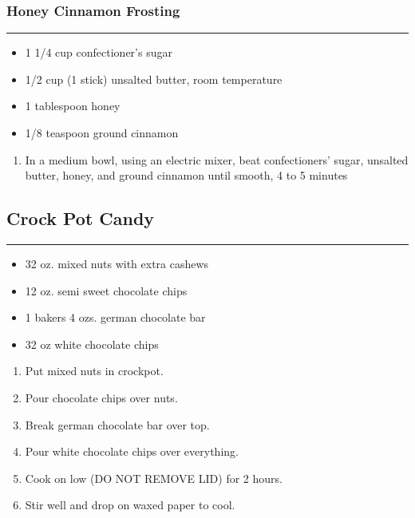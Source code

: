 \documentclass{article}
\begin{document}
\subsubsection{Honey Cinnamon Frosting}
\noindent\rule[0.5ex]{\linewidth}{0.5pt}

\begin{framed}
    \begin{itemize}
        \item 1 1/4 cup confectioner's sugar 
        \item 1/2 cup (1 stick) unsalted butter, room temperature
        \item 1 tablespoon honey
        \item 1/8 teaspoon ground cinnamon
    \end{itemize}
\end{framed}

\begin{enumerate}
    \item 
        In a medium bowl, using an electric mixer, beat confectioners' sugar, unsalted butter, honey, and ground cinnamon until smooth, 4 to 5 minutes
\end{enumerate}
\newpage
\newpage

\subsection{Crock Pot Candy} 
\noindent\rule[0.5ex]{\linewidth}{1pt}

\begin{framed}
    \begin{itemize}
        \item 32 oz. mixed nuts with extra cashews 
        \item 12 oz. semi sweet chocolate chips 
        \item 1 bakers 4 ozs. german chocolate bar
        \item 32 oz white chocolate chips
    \end{itemize}
\end{framed}

\begin{enumerate}
    \item 
        Put mixed nuts in crockpot. 
    \item 
        Pour chocolate chips over nuts.
    \item 
        Break german chocolate bar over top.
    \item 
        Pour white chocolate chips over everything.
    \item 
        Cook on low (DO NOT REMOVE LID) for 2 hours.
    \item 
        Stir well and drop on waxed paper to cool.
\end{enumerate}
\newpage
\end{document}
